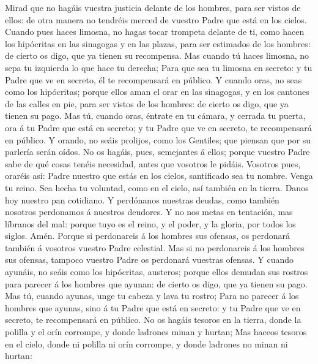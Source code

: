  Mirad que no hagáis vuestra justicia delante de los
hombres, para ser vistos de ellos: de otra manera no tendréis merced de
vuestro Padre que está en los cielos.  Cuando pues haces
limosna, no hagas tocar trompeta delante de ti, como hacen los
hipócritas en las sinagogas y en las plazas, para ser estimados de los
hombres: de cierto os digo, que ya tienen su recompensa. 
Mas cuando tú haces limosna, no sepa tu izquierda lo que hace tu
derecha;  Para que sea tu limosna en secreto: y tu Padre
que ve en secreto, él te recompensará en público.  Y
cuando oras, no seas como los hipócritas; porque ellos aman el orar en
las sinagogas, y en los cantones de las calles en pie, para ser vistos
de los hombres: de cierto os digo, que ya tienen su pago. 
Mas tú, cuando oras, éntrate en tu cámara, y cerrada tu puerta, ora á tu
Padre que está en secreto; y tu Padre que ve en secreto, te recompensará
en público.  Y orando, no seáis prolijos, como los
Gentiles; que piensan que por su parlería serán oídos.  No
os hagáis, pues, semejantes á ellos; porque vuestro Padre sabe de qué
cosas tenéis necesidad, antes que vosotros le pidáis. 
Vosotros pues, oraréis así: Padre nuestro que estás en los cielos,
santificado sea tu nombre.  Venga tu reino. Sea hecha tu
voluntad, como en el cielo, así también en la tierra. 
Danos hoy nuestro pan cotidiano.  Y perdónanos nuestras
deudas, como también nosotros perdonamos á nuestros deudores.
 Y no nos metas en tentación, mas líbranos del mal:
porque tuyo es el reino, y el poder, y la gloria, por todos los siglos.
Amén.  Porque si perdonareis á los hombres sus ofensas,
os perdonará también á vosotros vuestro Padre celestial. 
Mas si no perdonareis á los hombres sus ofensas, tampoco vuestro Padre
os perdonará vuestras ofensas.  Y cuando ayunáis, no
seáis como los hipócritas, austeros; porque ellos demudan sus rostros
para parecer á los hombres que ayunan: de cierto os digo, que ya tienen
su pago.  Mas tú, cuando ayunas, unge tu cabeza y lava tu
rostro;  Para no parecer á los hombres que ayunas, sino á
tu Padre que está en secreto: y tu Padre que ve en secreto, te
recompensará en público.  No os hagáis tesoros en la
tierra, donde la polilla y el orín corrompe, y donde ladrones minan y
hurtan;  Mas haceos tesoros en el cielo, donde ni polilla
ni orín corrompe, y donde ladrones no minan ni hurtan: 

